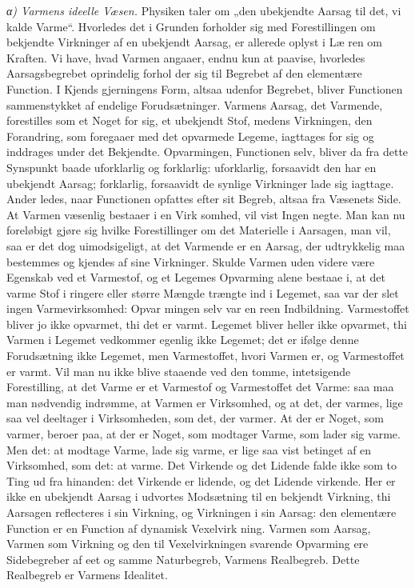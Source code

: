 \documentclass[12pt,a4paper]{book}
\newcommand{\subrunin}[1]{\emph{#1}\hspace{0.4em}}
\begin{document}
\subrunin{α) Varmens ideelle Væsen.} Physiken taler om „den ubekjendte
Aarsag til det, vi kalde Varme“. Hvorledes det i Grunden forholder sig
med Forestillingen om bekjendte Virkninger af en ubekjendt Aarsag, er
allerede oplyst i Læ\-%
ren om Kraften. Vi have, hvad Varmen angaaer, endnu kun at paavise,
hvorledes Aarsagsbegrebet oprindelig forhol\-%
der sig til Begrebet af den elementære Function. I Kjends\-%
gjerningens Form, altsaa udenfor Begrebet, bliver Functionen
sammenstykket af endelige Forudsætninger. Varmens Aarsag, det
Varmende, forestilles som et Noget for sig, et ubekjendt Stof, medens
Virkningen, den Forandring, som foregaaer med det opvarmede Legeme,
iagttages for sig og inddrages under det Bekjendte. Opvarmingen,
Functionen selv, bliver da fra dette Synspunkt baade uforklarlig og
forklarlig: uforklarlig, forsaavidt den har en ubekjendt Aarsag;
forklarlig, forsaavidt de synlige Virkninger lade sig iagttage.
Ander\-%
ledes, naar Functionen opfattes efter sit Begreb, altsaa fra Væsenets
Side. At Varmen væsenlig bestaaer i en Virk\-%
somhed, vil vist Ingen negte. Man kan nu foreløbigt gjøre sig hvilke
Forestillinger om det Materielle i Aarsagen, man vil, saa er det dog
uimodsigeligt, at det Varmende er en Aarsag, der udtrykkelig maa
bestemmes og kjendes af sine Virkninger. Skulde Varmen uden videre være
Egenskab ved et Varmestof, og et Legemes Opvarming alene bestaae i, at
det varme Stof i ringere eller større Mængde trængte ind i Legemet, saa
var der slet ingen Varmevirksomhed: Opvar\-%
mingen selv var en reen Indbildning. Varmestoffet bliver jo ikke
opvarmet, thi det er varmt. Legemet bliver heller ikke opvarmet, thi
Varmen i Legemet vedkommer egenlig ikke Legemet; det er ifølge denne
Forudsætning ikke Legemet, men Varmestoffet, hvori Varmen er, og
Varmestoffet er varmt. Vil man nu ikke blive staaende ved den tomme,
intetsigende Forestilling, at det Varme er et Varmestof og Varmestoffet
det Varme: saa maa man nødvendig indrømme, at Varmen er Virksomhed, og
at det, der varmes, lige saa vel deeltager i Virksomheden, som det, der
varmer. At der er Noget, som varmer, beroer paa, at der er Noget, som
modtager Varme, som lader sig varme. Men det: at modtage Varme, lade
sig varme, er lige saa vist betinget af en Virksomhed, som det: at
varme. Det Virkende og det Lidende falde ikke som to Ting ud fra
hinanden: det Virkende er lidende, og det Lidende virkende. Her er ikke
en ubekjendt Aarsag i udvortes Modsætning til en bekjendt Virkning, thi
Aarsagen reflecteres i sin Virkning, og Virkningen i sin Aarsag: den
elementære Function er en Function af dynamisk Vexelvirk\-%
ning. Varmen som Aarsag, Varmen som Virkning og den til
Vexelvirkningen svarende Opvarming ere Sidebegreber af eet og samme
Naturbegreb, Varmens Realbegreb. Dette Realbegreb er Varmens Idealitet.
\end{document}
